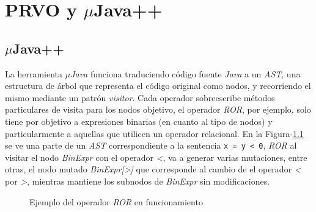 \chapter[Implementaci\'on]{PRVO y $\mu$Java++}
\label{cap:implementation}

\section{$\mu$Java++}

La herramienta \emph{$\mu$Java} \cite{bibliography.mutation.tools.muJavaMaOK05} funciona traduciendo c\'odigo fuente \emph{Java} a un \emph{AST}, una estructura de \'arbol que representa el c\'odigo original como nodos, y recorriendo el mismo mediante un patr\'on \emph{visitor}. Cada operador sobreescribe m\'etodos particulares de visita para los nodos objetivo, el operador \emph{ROR}, por ejemplo, solo tiene por objetivo a expresiones binarias (en cuanto al tipo de nodos) y particularmente a aquellas que utilicen un operador relacional. En la Figura-\ref{figures.examples.rorMutation} se ve una parte de un \emph{AST} correspondiente a la sentencia \lstinline|x = y < 0|, \emph{ROR} al visitar el nodo \emph{BinExpr} con el operador \emph{<}, va a generar varias mutaciones, entre otras, el nodo mutado \emph{BinExpr[>]} que corresponde al cambio de el operador \emph{<} por \emph{>}, mientras mantiene los subnodos de \emph{BinExpr} sin modificaciones.

\begin{figure}
	\caption{Ejemplo del operador \emph{ROR} en funcionamiento}
	\label{figures.examples.rorMutation}
\end{figure}

